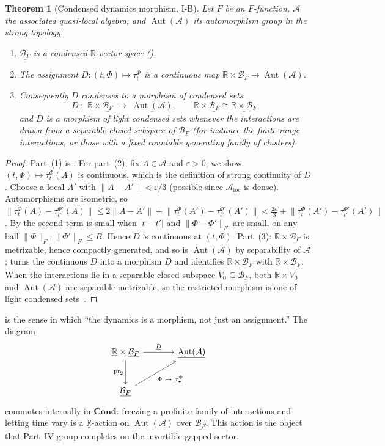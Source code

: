 \documentclass[12pt]{article}
\newcommand{\cond}[1]{\underline{#1}}          %
\newcommand{\Ffun}{F}                          %
\newcommand{\BF}{\mathcal{B}_{F}}              %
\newcommand{\qA}{\mathcal{A}}
\newcommand{\Aut}{\operatorname{Aut}}
\newcommand{\norm}[1]{\lVert #1\rVert}
\newcommand{\Fnorm}[1]{\lVert #1\rVert_{F}}
\newcommand{\loc}{\mathrm{loc}}
\newcommand{\R}{\mathbb{R}}
\newcommand{\Set}{\mathbf{Cond}}
\newtheorem{theorem}{Theorem}[section]
\theoremstyle{definition}
\theoremstyle{remark}
\begin{document}
\begin{theorem}[Condensed dynamics morphism, I-B]
\label{thm:condensed-dynamics}
Let $\Ffun$ be an $\Ffun$-function, $\qA$ the associated quasi-local algebra, and
$\Aut(\qA)$ its automorphism group in the strong topology.
\begin{enumerate}
\item $\cond{\BF}$ is a condensed $\R$-vector space ().
\item The assignment $D:(t,\Phi)\mapsto\tau^\Phi_t$ is a continuous map
  $\R\times\BF\to\Aut(\qA)$.
\item Consequently $D$ condenses to a morphism of condensed sets
  \[
    \cond{D}\;:\;\cond{\R}\times\cond{\BF}\;\longrightarrow\;\cond{\Aut(\qA)},
    \qquad \cond{\R}\times\cond{\BF}\cong\cond{\R\times\BF},
  \]
  and $\cond{D}$ is a morphism of light condensed sets whenever the interactions are drawn
  from a separable closed subspace of $\BF$ (for instance the finite-range interactions, or
  those with a fixed countable generating family of clusters).
\end{enumerate}
\end{theorem}
\begin{proof}
Part~(1) is . For part~(2), fix $A\in\qA$ and $\varepsilon>0$; we show
$(t,\Phi)\mapsto\tau^\Phi_t(A)$ is continuous, which is the definition of strong continuity of
$D$. Choose a local $A'$ with $\norm{A-A'}<\varepsilon/3$ (possible since $\qA_\loc$ is
dense). Automorphisms are isometric, so
$\norm{\tau^\Phi_t(A)-\tau^{\Phi'}_{t'}(A)}\le
2\norm{A-A'}+\norm{\tau^\Phi_t(A')-\tau^{\Phi'}_{t'}(A')}<\tfrac{2\varepsilon}{3}
+\norm{\tau^\Phi_t(A')-\tau^{\Phi'}_{t'}(A')}$.
By  the second term is small when $\lvert t-t'\rvert$ and
$\Fnorm{\Phi-\Phi'}$ are small, on any ball $\Fnorm{\Phi},\Fnorm{\Phi'}\le B$. Hence $D$ is
continuous at $(t,\Phi)$. Part~(3): $\R\times\BF$ is metrizable, hence compactly generated,
and so is $\Aut(\qA)$ by separability of $\qA$;  turns the continuous
$D$ into a morphism $\cond{D}$ and identifies $\cond{\R\times\BF}$ with
$\cond{\R}\times\cond{\BF}$. When the interactions lie in a separable closed subspace $V_0
\subseteq\BF$, both $\R\times V_0$ and $\Aut(\qA)$ are separable metrizable, so the restricted
morphism is one of light condensed sets~\cite{clausen-scholze-analytic-stacks}.
\end{proof}

 is the sense in which ``the dynamics is a morphism, not just an
assignment.'' The diagram
\[
\begin{tikzcd}[column sep=large, row sep=large]
  \cond{\R}\times\cond{\BF} \arrow[r, "\cond{D}"] \arrow[d, "\mathrm{pr}_2"']
    & \cond{\Aut(\qA)} \\
  \cond{\BF} \arrow[ur, "\Phi\ \mapsto\ \cond{\tau^{\Phi}_{\bullet}}"']
\end{tikzcd}
\]
commutes internally in $\Set$: freezing a profinite family of interactions and letting time
vary is a $\cond{\R}$-action on $\cond{\Aut(\qA)}$ over $\cond{\BF}$. This action is the object
that Part~IV group-completes on the invertible gapped sector.
\end{document}
